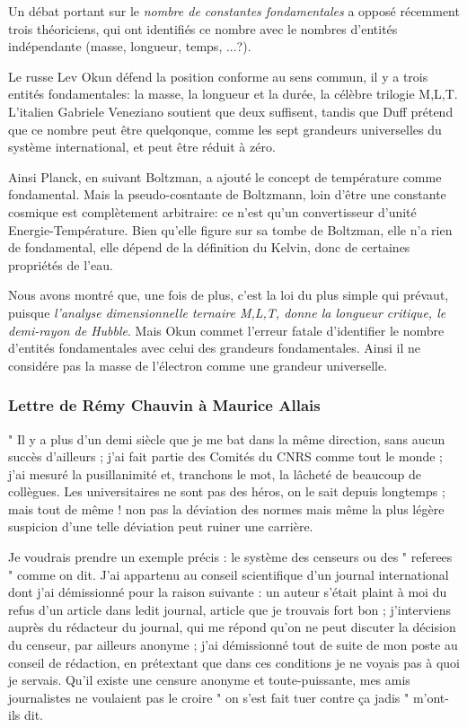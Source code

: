 \documentclass[a4paper,12pt]{article}
\begin{document}
Un débat portant sur le \textit{nombre de constantes fondamentales} a opposé récemment trois théoriciens, qui ont identifiés ce nombre avec le nombres d'entités indépendante (masse, longueur, temps, ...?). 

Le russe Lev Okun défend la position conforme au sens commun, il y a trois entités fondamentales: la masse, la longueur et la durée, la célèbre trilogie M,L,T. L'italien Gabriele Veneziano soutient que deux suffisent, tandis que Duff prétend que ce nombre peut être quelqonque, comme les sept grandeurs universelles du système international, et peut être réduit à zéro. 

Ainsi Planck, en suivant Boltzman, a ajouté le concept de température comme fondamental. Mais la pseudo-cosntante de Boltzmann, loin d'être une constante cosmique est complètement arbitraire: ce n'est qu'un convertisseur d'unité Energie-Température. Bien qu'elle figure sur sa tombe de Boltzman, elle n'a rien de fondamental, elle dépend de la définition du Kelvin, donc de certaines propriétés de l'eau.

Nous avons montré que, une fois de plus, c'est la loi du plus simple qui prévaut, puisque \textit{l'analyse dimensionnelle ternaire M,L,T, donne la longueur critique, le demi-rayon de Hubble}. Mais Okun commet l'erreur fatale d'identifier le nombre d'entités fondamentales avec celui des grandeurs fondamentales. Ainsi il ne considére pas la masse de l'électron comme une grandeur universelle.



\subsubsection {Lettre de Rémy Chauvin à Maurice Allais}

" Il y a plus d’un demi siècle que je me bat dans la même direction, sans aucun succès d’ailleurs ; j’ai fait partie des Comités du CNRS comme tout le monde ; j’ai mesuré la pusillanimité et, tranchons le mot, la lâcheté de beaucoup de collègues. Les universitaires ne sont pas des héros, on le sait depuis longtemps ; mais tout de même ! non pas la déviation des normes mais même la plus légère suspicion d’une telle déviation peut ruiner une carrière. 

Je voudrais prendre un exemple précis : le système des censeurs ou des " referees " comme on dit. J’ai appartenu au conseil scientifique d’un journal international dont j’ai démissionné pour la raison suivante : un auteur s’était plaint à moi du refus d’un article dans ledit journal, article que je trouvais fort bon ; j’interviens auprès du rédacteur du journal, qui me répond qu’on ne peut discuter la décision du censeur, par ailleurs anonyme ; j’ai démissionné tout de suite de mon poste au conseil de rédaction, en prétextant que dans ces conditions je ne voyais pas à quoi je servais. 
Qu’il existe une censure anonyme et toute-puissante, mes amis journalistes ne voulaient pas le croire " on s’est fait tuer contre ça jadis " m’ont-ils dit.
\end{document}
